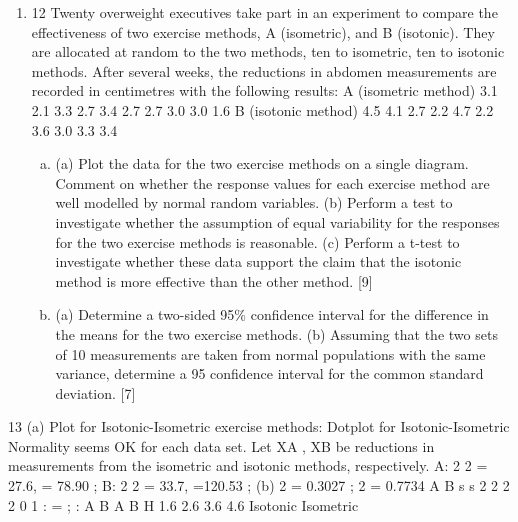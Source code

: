 \documentclass[a4paper,12pt]{article}
\begin{document}
\begin{enumerate}
\item 12 Twenty overweight executives take part in an experiment to compare the
effectiveness of two exercise methods, A (isometric), and B (isotonic). They are
allocated at random to the two methods, ten to isometric, ten to isotonic methods.
After several weeks, the reductions in abdomen measurements are recorded in
centimetres with the following results:
A (isometric method) 3.1 2.1 3.3 2.7 3.4 2.7 2.7 3.0 3.0 1.6
B (isotonic method) 4.5 4.1 2.7 2.2 4.7 2.2 3.6 3.0 3.3 3.4
\begin{enumerate}[(a)]
\item (a) Plot the data for the two exercise methods on a single diagram.
Comment on whether the response values for each exercise method
are well modelled by normal random variables.
(b) Perform a test to investigate whether the assumption of equal
variability for the responses for the two exercise methods is
reasonable.
(c) Perform a t-test to investigate whether these data support the
claim that the isotonic method is more effective than the other
method. [9]
\item (a) Determine a two-sided 95\% confidence interval for the difference in
the means for the two exercise methods.
(b) Assuming that the two sets of 10 measurements are taken from
normal populations with the same variance, determine a 95%
confidence interval for the common standard deviation. [7]
\end{enumerate}



\end{enumerate}

13  (a) Plot for Isotonic-Isometric exercise methods:
Dotplot for Isotonic-Isometric
Normality seems OK for each data set.
Let XA , XB be reductions in measurements from the isometric and
isotonic methods, respectively.
A: 2 2 = 27.6, = 78.90 ; %
B: 2 2 = 33.7, =120.53 ; %
(b) 2 = 0.3027 ; 2 = 0.7734 A B s s
2 2 2 2
0 1 : = ; : A B A B H %
1.6 2.6 3.6 4.6
Isotonic
Isometric
\end{document}
